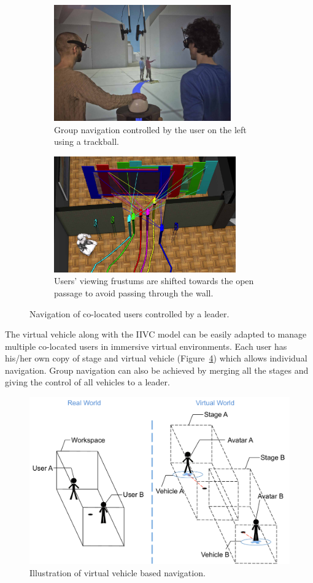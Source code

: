 \begin{figure}[htb]
  \begin{subfigure}{.5\textwidth}
    \centering
    \includegraphics[height=5cm]{figures/ch2/group_navig_1}
    \caption{Group navigation controlled by the user on the left using a trackball.}
    \label{fig:2_group_navig:group_navig_1}
  \end{subfigure}
  \begin{subfigure}{.5\textwidth}
    \centering
    \includegraphics[height=5cm]{figures/ch2/group_navig_2}
    \caption{Users' viewing frustums are shifted towards the open passage to avoid passing through the wall.}
    \label{fig:2_group_navig:group_navig_2}
  \end{subfigure}
  \caption{\label{fig:2_group_navig}Navigation of co-located users controlled by a leader.}
\end{figure}

The virtual vehicle along with the IIVC model can be easily adapted to manage multiple co-located users in immersive virtual environments. Each user has his/her own copy of stage and virtual vehicle (Figure~\ref{fig:2_multi_vehicle}) which allows individual navigation. Group navigation can also be achieved by merging all the stages and giving the control of all vehicles to a leader. 

\begin{figure}[htb]
  \centering
  \includegraphics[width=.8\textwidth]{figures/ch2/multi_vehicle}
  \caption{\label{fig:2_multi_vehicle}Illustration of virtual vehicle based navigation.}
\end{figure}

